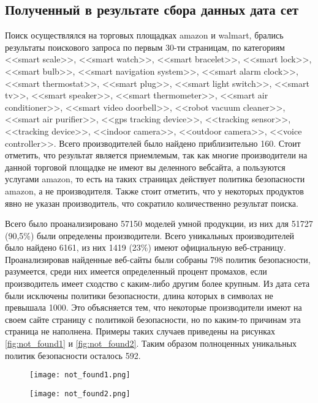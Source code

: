 \documentclass[../main]{subfiles}
\begin{document}
\subsection{Полученный в результате сбора данных дата сет}
Поиск осуществлялся на торговых площадках amazon и walmart, брались результаты поискового запроса по первым 30-ти страницам, по категориям <<smart scale>>, <<smart watch>>, <<smart bracelet>>, <<smart lock>>, <<smart bulb>>, <<smart navigation system>>, <<smart alarm clock>>, <<smart thermostat>>, <<smart plug>>, <<smart light switch>>, <<smart tv>>, <<smart speaker>>, <<smart thermometer>>, <<smart air conditioner>>, <<smart video doorbell>>, <<robot vacuum cleaner>>, <<smart air pu\-ri\-fi\-er>>, <<gps tracking device>>, <<tracking sensor>>, <<tracking device>>, <<indoor came\-ra>>, <<outdoor camera>>, <<voice controller>>. Всего производителей было найдено приблизительно 160. Стоит отметить, что результат является приемлемым, так как многие производители на данной торговой площадке не имеют вы деленного вебсайта, а пользуются услугами amazon, то есть на таких страницах действует политика безопасности amazon, а не производителя. Также стоит отметить, что у некоторых продуктов явно не указан производитель, что    сократило количественно результат поиска.

Всего было проанализировано 57150 моделей умной продукции, из них для 51727 (90,5\%) были определены производители. Всего уникальных производителей было найдено 6161, из них 1419 (23\%) имеют официальную веб-страницу. Проанализировав найденные веб-сайты были собраны 798 политик безопасности, разумеется, среди них имеется определенный процент промахов, если производитель имеет сходство с каким-либо другим более крупным. Из дата сета были исключены политики безопасности, длина которых в символах не превышала 1000. Это объясняется тем, что некоторые производители имеют на своем сайте страницу с политикой безопасности, но по каким-то причинам эта страница не наполнена. Примеры таких случаев приведены на рисунках \ref{fig:not_found1} и \ref{fig:not_found2}. Таким образом полноценных уникальных политик безопасности осталось 592.

\begin{figure}[H]
    \centering
    {\texttt{[image: not\_found1.png]}}
    \vspace{-\baselineskip}
\end{figure}

\begin{figure}[H]
    \centering
    {\texttt{[image: not\_found2.png]}}
    \vspace{-\baselineskip}
\end{figure}
\end{document}
